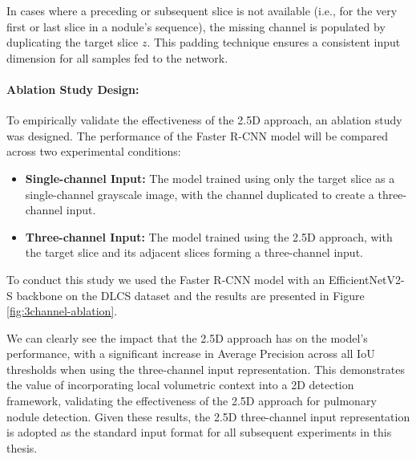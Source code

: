 In cases where a preceding or subsequent slice is not available (i.e., for the very first or last slice in a nodule's sequence), the missing channel is populated by duplicating the target slice $z$. This padding technique ensures a consistent input dimension for all samples fed to the network.

\paragraph{Ablation Study Design:}
To empirically validate the effectiveness of the 2.5D approach, an ablation study was designed. The performance of the Faster R-CNN model will be compared across two experimental conditions:
\begin{itemize}
    \item \textbf{Single-channel Input:} The model trained using only the target slice as a single-channel grayscale image, with the channel duplicated to create a three-channel input.
    \item \textbf{Three-channel Input:} The model trained using the 2.5D approach, with the target slice and its adjacent slices forming a three-channel input. 
\end{itemize}
To conduct this study we used the Faster R-CNN model with an EfficientNetV2-S backbone on the DLCS dataset and the results are presented in Figure \ref{fig:3channel-ablation}.



We can clearly see the impact that the 2.5D approach has on the model's performance, with a significant increase in Average Precision across all IoU thresholds when using the three-channel input representation. This demonstrates the value of incorporating local volumetric context into a 2D detection framework, validating the effectiveness of the 2.5D approach for pulmonary nodule detection. Given these results, the 2.5D three-channel input representation is adopted as the standard input format for all subsequent experiments in this thesis.

